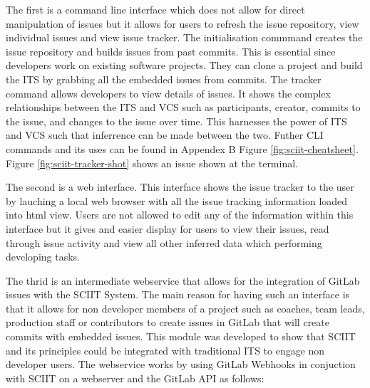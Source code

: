 \documentclass{mproj}
\begin{document}
The first is a command line interface which does not allow for direct manipulation of issues but it allows for users to refresh the issue repository, view individual issues and view issue tracker. The initialisation commmand creates the issue repository and builds issues from past commits. This is essential since developers work on existing software projects. They can clone a project and build the ITS by grabbing all the embedded issues from commits. The tracker command allows developers to view details of issues. It shows the complex relationships between the ITS and VCS such as participants, creator, commits to the issue, and changes to the issue over time. This harnesses the power of ITS and VCS such that inferrence can be made between the two. Futher CLI commands and its uses can be found in Appendex B Figure \ref{fig:sciit-cheatsheet}. Figure \ref{fig:sciit-tracker-shot} shows an issue shown at the terminal.

The second is a web interface. This interface shows the issue tracker to the user by lauching a local web browser with all the issue tracking information loaded into html view. Users are not allowed to edit any of the information within this interface but it gives and easier display for users to view their issues, read through issue activity and view all other inferred data which performing developing tasks.

The thrid is an intermediate webservice that allows for the integration of GitLab issues with the SCIIT System. The main reason for having such an interface is that it allows for non developer members of a project such as coaches, team leads, production staff or contributors to create issues in GitLab that will create commits with embedded issues. This module was developed to show that SCIIT and its principles could be integrated with traditional ITS to engage non developer users. The webservice works by using GitLab Webhooks in conjuction with SCIIT on a webserver and the GitLab API as follows:
\end{document}
